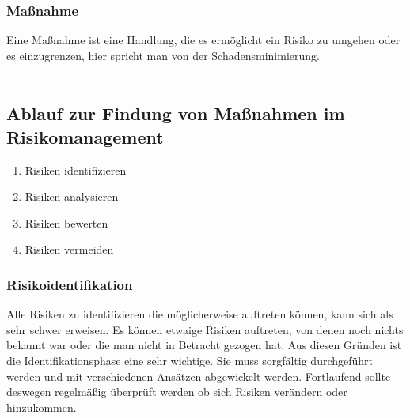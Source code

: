 \subsubsection{Maßnahme}
Eine Maßnahme ist eine Handlung, die es ermöglicht ein Risiko zu umgehen oder es einzugrenzen, hier spricht man von der Schadensminimierung. 
\\
\\
\subsection{Ablauf zur Findung von Maßnahmen im Risikomanagement}
\begin{enumerate}
    \item Risiken identifizieren
    \item Risiken analysieren
    \item Risiken bewerten
    \item Risiken vermeiden
\end{enumerate}

\subsubsection{Risikoidentifikation}
Alle Risiken zu identifizieren die möglicherweise auftreten können, kann sich als sehr schwer erweisen. Es können etwaige Risiken auftreten, von denen noch nichts bekannt war oder die man nicht in Betracht gezogen hat. Aus diesen Gründen ist die Identifikationsphase eine sehr wichtige. Sie muss sorgfältig durchgeführt werden und mit verschiedenen Ansätzen abgewickelt werden. Fortlaufend sollte deswegen regelmäßig überprüft werden ob sich Risiken verändern oder hinzukommen.
\\



